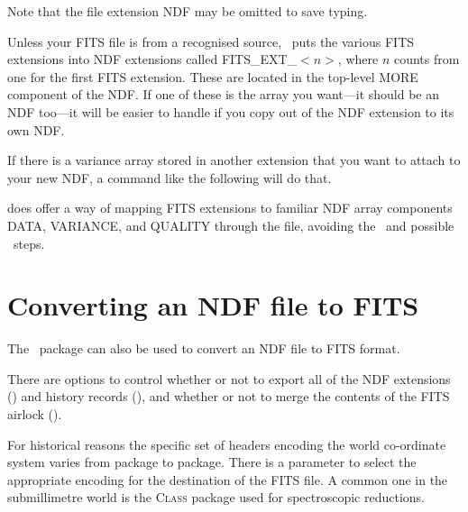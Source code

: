 \documentclass[11pt,oneside,chapters]{starlink}
\begin{document}
\begin{terminalv}
\end{terminalv}

Note that the  file extension NDF may be omitted to save
typing.

Unless your FITS file is from a recognised source, \fitstondf\ puts the
various FITS extensions into NDF extensions called FITS\_EXT\_$<\!n\!>$,
where $n$ counts from one for the first FITS extension. These are
located in the top-level MORE component of the NDF. If one of these is
the array you want---it should be an NDF too---it will be easier to
handle if you copy out of the NDF extension to its own NDF.

\begin{terminalv}
\end{terminalv}

If there is a variance array stored in another extension that you want
to attach to your new NDF, a command like the following will do that.

\begin{terminalv}
\end{terminalv}

 does offer a way of mapping FITS extensions to familiar NDF
array components DATA, VARIANCE, and QUALITY through the  file,
avoiding the \ndfcopy\ and possible \setvar\ steps.

\section{Converting an NDF file to FITS}

The \convert\ package can also be used to convert an NDF file to FITS format.

\begin{terminalv}
\end{terminalv}

There are options to control whether or not to export all of the NDF
extensions () and history records (),
and whether or not to merge the contents of the FITS airlock
().

For historical reasons the specific set of headers encoding the world
co-ordinate system varies from package to package.  There is a parameter
to select the appropriate encoding for the destination of the FITS file.
A common one in the submillimetre world is the \textsc{Class} package used
for spectroscopic reductions.
\end{document}
